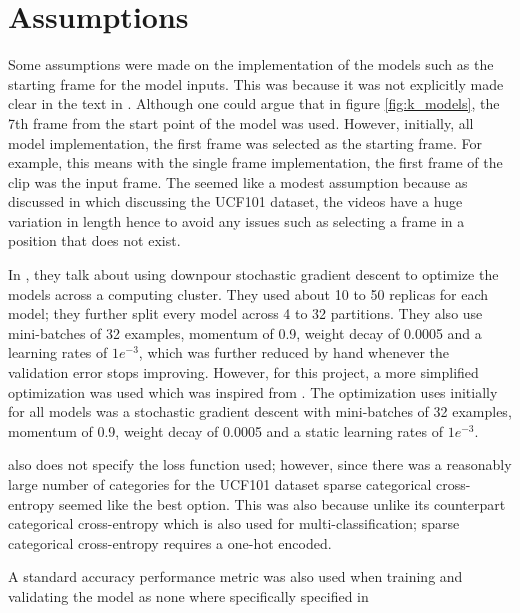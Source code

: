 \section{Assumptions}
Some assumptions were made on the implementation of the models such as the starting frame for the model inputs.  This was because it was not explicitly made clear in the text in \citep{KarpathyCVPR14}. Although one could argue that in figure \ref{fig:k_models}, the 7th frame from the start point of the model was used.  However, initially, all model implementation, the first frame was selected as the starting frame. For example, this means with the single frame implementation, the first frame of the clip was the input frame.  The seemed like a modest assumption because as discussed in \citep{soomro2012ucf101} which discussing the UCF101 dataset, the videos have a huge variation in length hence to avoid any issues such as selecting a frame in a position that does not exist.

In \citep{KarpathyCVPR14}, they talk about using downpour stochastic gradient descent to optimize the models across a computing cluster. They used about 10 to 50 replicas for each model; they further split every model across 4 to 32 partitions. They also use mini-batches of 32 examples, momentum of 0.9, weight decay of 0.0005 and a  learning rates of $1e^{-3}$, which was further reduced by hand whenever the validation error stops improving.  However, for this project, a more simplified optimization was used which was inspired from \citep{KarpathyCVPR14}. The optimization uses initially for all models was a stochastic gradient descent with mini-batches of 32 examples, momentum of 0.9, weight decay of 0.0005 and a static learning rates of $1e^{-3}$.

\citep{KarpathyCVPR14} also does not specify the loss function used; however, since there was a reasonably large number of categories for the UCF101 dataset sparse categorical cross-entropy seemed like the best option. This was also because unlike its counterpart categorical cross-entropy which is also used for multi-classification; sparse categorical cross-entropy requires a one-hot encoded. 

A standard accuracy performance metric was also used when  training and validating the model as none where specifically specified in \citep{KarpathyCVPR14}


